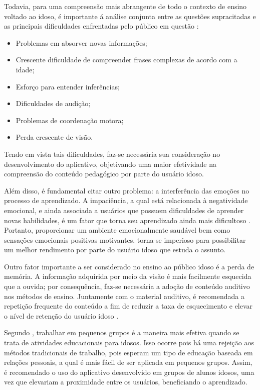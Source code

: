 Todavia, para uma compreensão mais abrangente de todo o contexto de ensino voltado ao idoso, é importante á análise conjunta entre as questões supracitadas e as principais dificuldades enfrentadas pelo público em questão \citep{euromed}:

\begin{itemize}
    \item Problemas em absorver novas informações;
    \item Crescente dificuldade de compreender frases complexas de acordo com a idade;
    \item Esforço para entender inferências;
    \item Dificuldades de audição;
    \item Problemas de coordenação motora;
    \item Perda crescente de visão.
\end{itemize}

Tendo em vista tais dificuldades, faz-se necessária sua consideração no desenvolvimento do aplicativo, objetivando uma maior efetividade na compreensão do conteúdo pedagógico por parte do usuário idoso.

Além disso, é fundamental citar outro problema: a interferência das emoções no processo de aprendizado. A impaciência, a qual está relacionada à negatividade emocional, e ainda associada a usuários que possuem dificuldades de aprender novas habilidades, é um fator que torna seu aprendizado ainda mais dificultoso \citep{Edukacja}. Portanto, proporcionar um ambiente emocionalmente saudável bem como sensações emocionais positivas motivantes, torna-se imperioso para possibilitar um melhor rendimento por parte do usuário idoso que estuda o assunto.

Outro fator importante a ser considerado no ensino ao público idoso é a perda de memória. A informação adquirida por meio da visão é mais facilmente esquecida que a ouvida; por consequência,  faz-se necessária a adoção de conteúdo auditivo nos métodos de ensino. Juntamente com o material auditivo, é recomendada a repetição frequente do conteúdo a fim de reduzir a taxa de esquecimento e elevar o nível de retenção do usuário idoso \citep{euromed}.

Segundo \cite{Edukacja}, trabalhar em pequenos grupos é a maneira mais efetiva quando se trata de atividades educacionais para idosos. Isso ocorre pois há uma rejeição aos métodos tradicionais de trabalho, pois esperam um tipo de educação baseada em relações pessoais, a qual é mais fácil de ser aplicada em pequenos grupos. Assim, é recomendado o uso do aplicativo desenvolvido em grupos de alunos idosos, uma vez que elevariam a proximidade entre os usuários, beneficiando o aprendizado.

